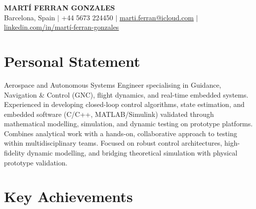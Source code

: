 \documentclass[a4paper,11pt]{article}
\begin{document}
\begin{center}
    \textbf{\Huge MARTÍ FERRAN GONZALES} \\ \vspace{1pt}
    \small Barcelona, Spain $|$ +44 5673 224450 $|$
    \href{mailto:marti.ferran@icloud.com}{\underline{marti.ferran@icloud.com}} $|$
    \href{https://www.linkedin.com/in/mart\%C3\%AD-ferran-gonzales-080348229}{\underline{linkedin.com/in/martí-ferran-gonzales}}
\end{center}

\section{Personal Statement}
{\small Aerospace and Autonomous Systems Engineer specialising in Guidance, Navigation \& Control (GNC), flight dynamics, and real-time embedded systems. Experienced in developing closed-loop control algorithms, state estimation, and embedded software (C/C++, MATLAB/Simulink) validated through mathematical modelling, simulation, and dynamic testing on prototype platforms. Combines analytical work with a hands-on, collaborative approach to testing within multidisciplinary teams.  Focused on robust control architectures, high-fidelity dynamic modelling, and bridging theoretical simulation with physical prototype validation.}

\section{Key Achievements}
  \resumeItemListStart
  \resumeItemListEnd
\end{document}
